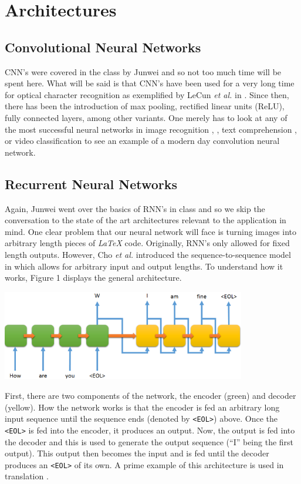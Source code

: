 \documentclass[12pt]{article}
\theoremstyle{colon}
\begin{document}
\clearpage

\section{Architectures}

\subsection*{Convolutional Neural Networks}

CNN's were covered in the class by Junwei and so not too much time will be spent here. What will be said is that CNN's have been used for a very long time for optical character recognition as exemplified by LeCun \textit{et al.} in \cite{lecun_bottou_bengio_haffner_1998}. Since then, there has been the introduction of max pooling, rectified linear units (ReLU), fully connected layers, among other variants. One merely has to look at any of the most successful neural networks in image recognition \cite{NIPS2012_4824}, \cite{szegedy2013deep}, text comprehension \cite{wang2012end}, or video classification \cite{karpathy2014large} to see an example of a modern day convolution neural network.

\subsection*{Recurrent Neural Networks}

Again, Junwei went over the basics of RNN's in class and so we skip the conversation to the state of the art architectures relevant to the application in mind. One clear problem that our neural network will face is turning images into arbitrary length pieces of \emph{LaTeX} code. Originally, RNN's only allowed for fixed length outputs. However, Cho \textit{et al.} introduced the sequence-to-sequence model in \cite{1406.1078} which allows for arbitrary input and output lengths. To understand how it works, Figure 1 displays the general architecture.
\begin{center}
  \includegraphics[width=0.8\textwidth]{sequence-to-sequence.png}
\end{center}
First, there are two components of the network, the encoder (green) and decoder (yellow). How the network works is that the encoder is fed an arbitrary long input sequence until the sequence ends (denoted by \texttt{<EOL>}) above. Once the \texttt{<EOL>} is fed into the encoder, it produces an output. Now, the output is fed into the decoder and this is used to generate the output sequence (``I'' being the first output). This output then becomes the input and is fed until the decoder produces an \texttt{<EOL>} of its own. A prime example of this architecture  is used in translation \cite{1409.3215}.
\end{document}
